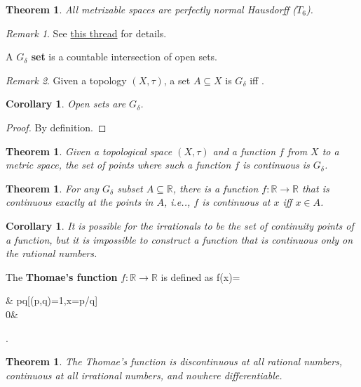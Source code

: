 \documentclass[12pt, letterpaper]{article}
\makeatletter
\newcommand{\nat}{\mathbb{N}}
\newcommand{\inte}{\mathbb{Z}}
\newcommand{\re}{\mathbb{R}}
\newcommand\ie{i.e\@ifnextchar.{}{.\@}}
\newcommand{\card}[1]{\left\lvert #1 \right\rvert}
\newenvironment{eqlong}{\equation\aligned}{\endaligned\endequation}
\newtheorem{cor}[prop]{Corollary}
\newtheorem{thm}[prop]{Theorem}
\theoremstyle{definition}
\theoremstyle{remark}
\newtheorem*{rem*}{Remark}
\theoremstyle{definition}
\theoremstyle{plain}
\numberwithin{equation}{section}
\makeatother
\begin{document}
	\begin{thm}
		All metrizable spaces are perfectly normal Hausdorff ($T_6$).
	\end{thm}
	\begin{rem*}
		See \href{https://math.stackexchange.com/questions/73609/is-a-metric-space-perfectly-normal}{this thread} for details.
	\end{rem*}

	\begin{def*}
		A \textbf{$G_\delta$ set} is a countable intersection of open sets.
	\end{def*}
	\begin{rem*}
		Given a topology $(X,\tau)$, a set $A\subseteq X$ is $G_\delta$ iff
		\begin{eqlong}
			\exists \sigma \subseteq \tau [\card{\sigma} \le \aleph_0 \land A = \bigcap \sigma].
		\end{eqlong}
	\end{rem*}
	\begin{cor}
		Open sets are $G_\delta$.
	\end{cor}
	\begin{proof}
		By definition.
	\end{proof}
	\begin{thm}
		Given a topological space $(X,\tau)$ and
		a function $f$ from $X$ to a metric space,
		the set of points where such a function $f$ is continuous is $G_\delta$.
	\end{thm}

	\begin{thm}
		For any $G_\delta$ subset $A\subseteq\re$, there is a function $f\colon\re\to\re$ that is continuous exactly at the points in $A$, \ie, $f$ is continuous at $x$ iff $x\in A$. 
	\end{thm}
	\begin{cor}
		It is possible for the irrationals to be the set of continuity points of a function,
		but it is impossible to construct a function that is continuous only on the rational numbers.
	\end{cor}
	\begin{def*}
		The \textbf{Thomae's function} $f\colon\re\to\re$ is defined as
		\begin{eqlong}
			f(x)=\begin{cases}
				& \exists p\in \inte\exists q\in \nat[(p,q)=1,x=p/q]\\
				0& \\
			\end{cases}.
		\end{eqlong}
	\end{def*}
	\begin{thm}
		The Thomae's function is discontinuous at all rational numbers,
		continuous at all irrational numbers,
		and nowhere differentiable.
	\end{thm}
\end{document}
